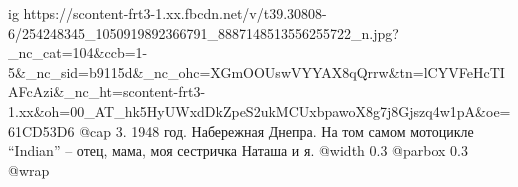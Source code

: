  
 
 
 
 

\ifcmt
  ig https://scontent-frt3-1.xx.fbcdn.net/v/t39.30808-6/254248345_1050919892366791_8887148513556255722_n.jpg?_nc_cat=104&ccb=1-5&_nc_sid=b9115d&_nc_ohc=XGmOOUswVYYAX8qQrrw&tn=lCYVFeHcTIAFcAzi&_nc_ht=scontent-frt3-1.xx&oh=00_AT_hk5HyUWxdDkZpeS2ukMCUxbpawoX8g7j8Gjszq4w1pA&oe=61CD53D6
  @cap 3. 1948 год. Набережная Днепра. На том самом мотоцикле \enquote{Indian} – отец, мама, моя сестричка Наташа и я. 
  @width 0.3
  @parbox 0.3
  @wrap \parpic[r]
\fi
